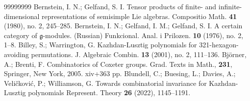 \documentclass[a4paper]{amsart}
\begin{document}
% 
% 


\begin{thebibliography}{99999999}
 Bernstein, I. N.; Gelfand, S. I. Tensor products of finite- 
and infinite-dimensional representations of semisimple Lie algebras. Compositio
Math. {\bf 41} (1980), no. 2, 245--285. 
 Bernstein, I. N.; Gelfand, I. M.; Gelfand, S. I. 
A certain category of $\mathfrak{g}$-modules. (Russian) Funkcional. Anal. i 
Prilozen. {\bf 10} (1976), no. 2, 1--8.
  Billey, S.; Warrington, G. Kazhdan-Lusztig polynomials for 
321-hexagon-avoiding permutations. J. Algebraic Combin. {\bf 13} (2001), no. 2, 
111--136. 
Bj{\"o}rner, A.; Brenti, F.
Combinatorics of Coxeter groups.
Grad. Texts in Math., {\bf 231},
Springer, New York, 2005. xiv+363 pp.
Blundell, C.; Buesing, L.; Davies, A.; Veli{\v c}kovi{\'c}, P.; Williamson, G.
Towards combinatorial invariance for Kazhdan-Lusztig polynomials
Represent. Theory {\bf 26} (2022), 1145--1191.

\end{thebibliography}
\end{document}
